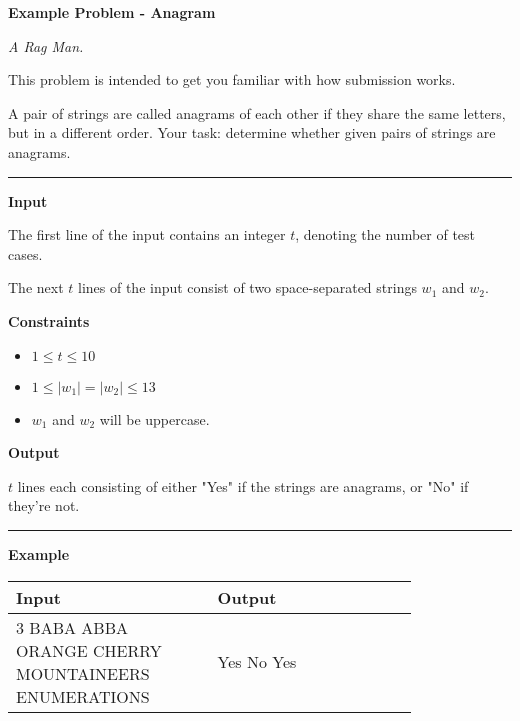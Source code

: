 \LARGE {} \textbf{Example Problem - Anagram} \normalsize

{\itshape A Rag Man.}

This problem is intended to get you familiar with how submission works.

A pair of strings are called anagrams of each other if they share the same letters, but in a different order.
Your task: determine whether given pairs of strings are anagrams.

\vspace{8pt}
\hrule

\textbf{Input}

The first line of the input contains an integer $t$, denoting the number of test cases.

The next $t$ lines of the input consist of two space-separated strings $w_1$ and $w_2$.

\textbf{Constraints}

\begin{itemize}
    \item $1 \leq t \leq 10$
    \item $1 \leq |w_1| = |w_2| \leq 13$
    \item $w_1$ and $w_2$ will be uppercase.
\end{itemize}

\textbf{Output}

$t$ lines each consisting of either "Yes" if the strings are anagrams, or "No" if they're not.

\vspace{8pt}
\hrule

\textbf{Example}

\begin{table}[h]
    \centering
    \begin{tabular}{|p{0.4\linewidth}|p{0.4\linewidth}|}
        \hline
        Input & Output \\
        \hline
        3 \newline BABA ABBA \newline ORANGE CHERRY \newline MOUNTAINEERS ENUMERATIONS & 
        \text{} \newline Yes \newline No \newline Yes \\
        \hline
    \end{tabular}
\end{table}

